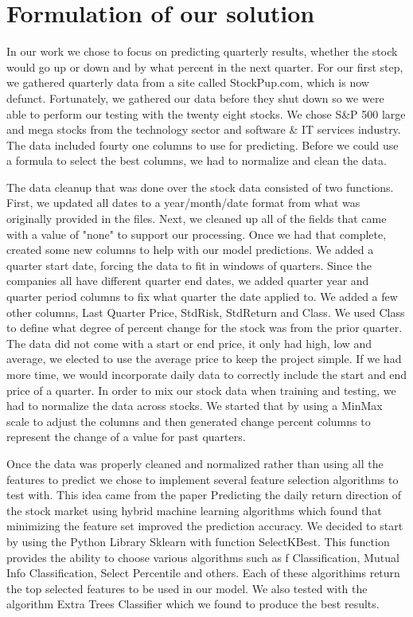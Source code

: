 \documentclass[conference]{IEEEtran}
\begin{document}
\section{Formulation of our solution}
In our work we chose to focus on predicting quarterly results, whether the stock would go up or down and by what percent in the next quarter.  For our first step, we gathered quarterly data from a site called StockPup.com, which is now defunct. Fortunately, we gathered our data before they shut down so we were able to perform our testing with the twenty eight stocks. We chose S\&P 500 large and mega stocks from the technology sector and software \& IT services industry.  The data included fourty one columns to use for predicting.  Before we could use a formula to select the best columns, we had to normalize and clean the data. 

The data cleanup that was done over the stock data consisted of two functions.  First, we updated all dates to a year/month/date format from what was originally provided in the files.  Next, we cleaned up all of the fields that came with a value of "none" to support our processing.  Once we had that complete, created some new columns to help with our model predictions.  We added a quarter start date, forcing the data to fit in windows of quarters.  Since the companies all have different quarter end dates, we added quarter year and quarter period columns to fix what quarter the date applied to.  We added a few other columns, Last Quarter Price, StdRisk, StdReturn and Class. We used Class to define what degree of percent change for the stock was from the prior quarter.  The data did not come with a start or end price, it only had high, low and average, we elected to use the average price to keep the project simple.  If we had more time, we would incorporate daily data to correctly include the start and end price of a quarter.  In order to mix our stock data when training and testing, we had to normalize the data across stocks.  We started that by using a MinMax scale to adjust the columns and then generated change percent columns to represent the change of a value for past quarters.  

Once the data was properly cleaned and normalized rather than using all the features to predict we chose to implement several feature selection algorithms to test with.  This idea came from the paper Predicting the daily return direction of the stock market using hybrid machine learning algorithms \cite{DailyReturnDirection} which found that minimizing the feature set improved the prediction accuracy.  We decided to start by using the Python Library Sklearn with function SelectKBest.  This function provides the ability to choose various algorithms such as f Classification, Mutual Info Classification, Select Percentile and others.  Each of these algorithims return the top selected features to be used in our model. We also tested with the algorithm Extra Trees Classifier which we found to produce the best results.
\end{document}
